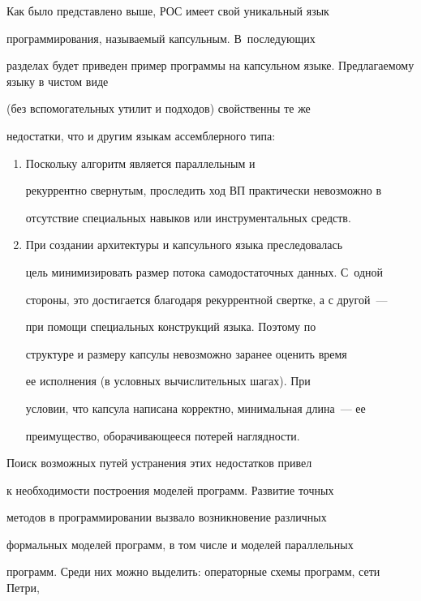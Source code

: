    Как было представлено выше,  РОС имеет свой уникальный язык 


программирования, называемый  капсульным. В~последующих 


разделах будет приведен пример программы на капсульном языке. Предлагаемому языку в чистом виде 


(без вспомогательных утилит и подходов) свойственны те же 


недостатки, что и другим языкам  ассемблерного типа:\\[-15pt]


   \begin{enumerate}[1.]


   \item Поскольку алгоритм является параллельным и 


рекуррентно свернутым, проследить  ход ВП практически невозможно в 


отсутствие специальных навыков или инструментальных средств.\\[-15pt]


   \item При создании архитектуры  и капсульного языка преследовалась 


цель минимизировать размер потока  самодостаточных данных. С~одной 


стороны, это достигается благодаря  рекуррентной свертке, а с другой~--- 


при помощи специальных  конструкций языка. Поэтому по 


структуре и размеру капсулы  невозможно заранее оценить время 


ее исполнения (в условных  вычислительных шагах). При 


условии, что капсула написана  корректно, минимальная длина~--- ее 


преимущество, оборачивающееся  потерей наглядности.


   \end{enumerate}


   


   Поиск возможных путей устранения этих недостатков привел 


к необхо\-ди\-мости построения  моделей программ. Развитие точных 


методов в программировании  вызвало возникновение различных 


формальных моделей программ, в  том числе и моделей параллельных 


программ. Среди них можно выделить: операторные схемы программ, сети Петри, 


